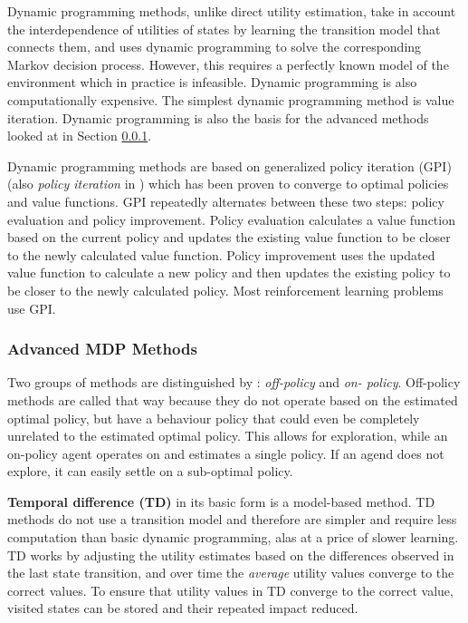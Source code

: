 Dynamic programming methods, unlike direct utility estimation, take in account
the interdependence of utilities of states by learning the transition model
that connects them, and uses dynamic programming to solve the corresponding
Markov decision process. However, this requires a perfectly known model of the
environment which in practice is infeasible. Dynamic programming is also
computationally expensive. The simplest dynamic programming method is value
iteration. Dynamic programming is also the basis for the advanced methods
looked at in Section \ref{sec:ai:mdp:methods:advanced}.
\parencite{Sutton1998ai+reinforcement}

Dynamic programming methods are based on generalized policy iteration (GPI)
(also \textit{policy iteration} in \textcite{Russell2010ai+modern}) which has
been proven to converge to optimal policies and value functions. GPI repeatedly
alternates between these two steps: policy evaluation and policy improvement.
Policy evaluation calculates a value function based on the current policy and
updates the existing value function to be closer to the newly calculated value
function. Policy improvement uses the updated value function to calculate a new
policy and then updates the existing policy to be closer to the newly
calculated policy. Most reinforcement learning problems use GPI.
\parencite{Sutton1998ai+reinforcement}

\subsubsection{Advanced MDP Methods}
\label{sec:ai:mdp:methods:advanced}

Two groups of methods are distinguished by
\textcite{Sutton1998ai+reinforcement}: \textit{off-policy} and \textit{on-
policy}. Off-policy methods are called that way because they do not operate
based on the estimated optimal policy, but have a behaviour policy that could
even be completely unrelated to the estimated optimal policy. This allows for
exploration, while an on-policy agent operates on and estimates a single
policy. If an agend does not explore, it can easily settle on a sub-optimal
policy.

\textbf{Temporal difference (TD)} in its basic form is a model-based method. TD
methods do not use a transition model and therefore are simpler and require
less computation than basic dynamic programming, alas at a price of slower
learning. TD works by adjusting the utility estimates based on the differences
observed in the last state transition, and over time the \textit{average}
utility values converge to the correct values. To ensure that utility values in
TD converge to the correct value, visited states can be stored and their
repeated impact reduced. \parencite{Russell2010ai+modern}


